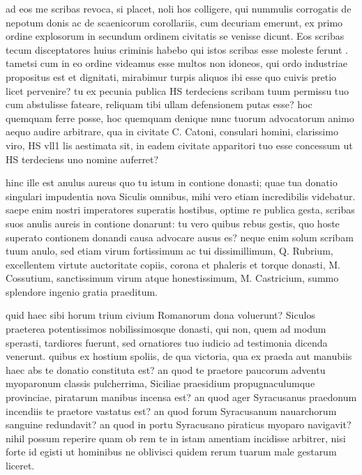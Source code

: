  ad eos me scribas revoca, si placet, noli hos colligere, qui nummulis corrogatis de nepotum donis ac de scaenicorum corollariis, cum decuriam emerunt, ex primo ordine explosorum in secundum ordinem civitatis se venisse dicunt. Eos scribas tecum disceptatores huius criminis habebo qui istos scribas esse moleste ferunt . tametsi cum in eo ordine videamus esse multos non idoneos, qui ordo industriae propositus est et dignitati, mirabimur turpis aliquos ibi esse quo cuivis pretio licet pervenire? tu ex pecunia publica HS terdeciens scribam tuum permissu tuo cum abstulisse fateare, reliquam tibi ullam defensionem putas esse? hoc quemquam ferre posse, hoc quemquam denique nunc tuorum advocatorum animo aequo audire arbitrare, qua in civitate C. Catoni, consulari homini, clarissimo viro, HS vll1 lis aestimata sit, in eadem civitate apparitori tuo esse concessum ut HS terdeciens uno nomine auferret?

 hinc ille est anulus aureus quo tu istum in contione donasti; quae tua donatio singulari impudentia nova Siculis omnibus, mihi vero etiam incredibilis videbatur. saepe enim nostri imperatores superatis hostibus, optime re publica gesta, scribas suos anulis aureis in contione donarunt: tu vero quibus rebus gestis, quo hoste superato contionem donandi causa advocare ausus es? neque enim solum scribam tuum anulo, sed etiam virum fortissimum ac tui dissimillimum, Q. Rubrium, excellentem virtute auctoritate copiis, corona et phaleris et torque donasti, M. Cossutium, sanctissimum virum atque honestissimum, M. Castricium, summo splendore ingenio gratia praeditum.

 quid haec sibi horum trium civium Romanorum dona voluerunt? Siculos praeterea potentissimos nobilissimosque donasti, qui non, quem ad modum sperasti, tardiores fuerunt, sed ornatiores tuo iudicio ad testimonia dicenda venerunt. quibus ex hostium spoliis, de qua victoria, qua ex praeda aut manubiis haec abs te donatio constituta est? an quod te praetore paucorum adventu myoparonum classis pulcherrima, Siciliae praesidium propugnaculumque provinciae, piratarum manibus incensa est? an quod ager Syracusanus praedonum incendiis te praetore vastatus est? an quod forum Syracusanum nauarchorum sanguine redundavit? an quod in portu Syracusano piraticus myoparo navigavit? nihil possum reperire quam ob rem te in istam amentiam incidisse arbitrer, nisi forte id egisti ut hominibus ne oblivisci quidem rerum tuarum male gestarum liceret.

